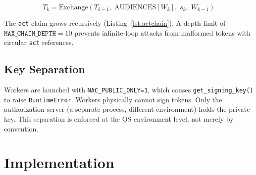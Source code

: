 \documentclass[journal]{IEEEtran}
\begin{document}
\begin{equation}
T_{k} = \text{Exchange}(T_{k-1},\; \text{AUDIENCES}[W_{k}],\; s_k,\; W_{k-1})
\end{equation}

The \texttt{act} claim grows recursively (Listing~\ref{lst:actchain}). A depth limit of $\texttt{MAX\_CHAIN\_DEPTH} = 10$ prevents infinite-loop attacks from malformed tokens with circular \texttt{act} references.

\subsection{Key Separation}

Workers are launched with \texttt{NAC\_PUBLIC\_ONLY=1}, which causes \texttt{get\_signing\_key()} to raise \texttt{RuntimeError}. Workers physically cannot sign tokens. Only the authorization server (a separate process, different environment) holds the private key. This separation is enforced at the OS environment level, not merely by convention.



\section{Implementation}
\label{sec:implementation}
\end{document}

